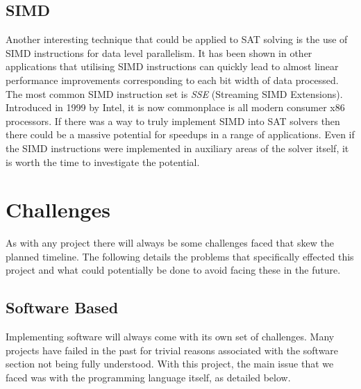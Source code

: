 \documentclass{article}
\begin{document}

\subsection{SIMD}
Another interesting technique that could be applied to SAT solving is the use of SIMD instructions for data level parallelism. It
has been shown in other applications that utilising SIMD instructions can quickly lead to almost linear performance improvements
corresponding to each bit width of data processed. The most common SIMD instruction set is \textit{SSE} (Streaming SIMD
Extensions). Introduced in 1999 by Intel, it is now commonplace is all modern consumer x86 processors. If there was a way to truly
implement SIMD into SAT solvers then there could be a massive potential for speedups in a range of applications. Even if the SIMD
instructions were implemented in auxiliary areas of the solver itself, it is worth the time to investigate the potential.


\section{Challenges}
As with any project there will always be some challenges faced that skew the planned timeline. The following details the problems
that specifically effected this project and what could potentially be done to avoid facing these in the future.

\subsection{Software Based}
Implementing software will always come with its own set of challenges. Many projects have failed in the past for trivial reasons
associated with the software section not being fully understood. With this project, the main issue that we faced was with the
programming language itself, as detailed below.
\end{document}
